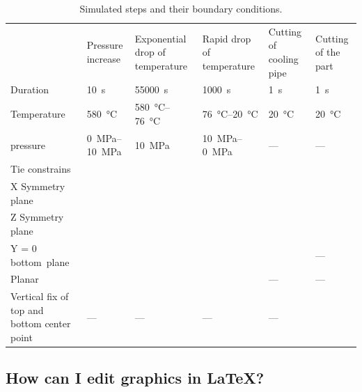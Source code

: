 \begin{table}
	\begin{fullpage} %
			\centering
			\footnotesize
			\begin{tabularx}{\linewidth}{>{\raggedright\arraybackslash}X >{\centering\arraybackslash}X >{\centering\arraybackslash}X >{\centering\arraybackslash}X >{\centering\arraybackslash}X >{\centering\arraybackslash}X}
			  \toprule
			  & Pressure increase & Exponential drop of temperature & Rapid drop of temperature & Cutting of cooling pipe & Cutting of the part \\
			  \cmidrule(r){2-4} \cmidrule(l){5-6}
			  Duration & \qty{10}{\second} & \qty{55000}{\second} & \qty{1000}{\second} & \qty{1}{\second} & \qty{1}{\second} \\
			  \midrule
			  Temperature  & \qty{580}{\celsius} & \qtyrange[range-units=single]{580}{76}{\celsius} & \qtyrange[range-units=single]{76}{20}{\celsius} & \qty{20}{\celsius} & \qty{20}{\celsius} \\
			  \midrule
			  \glsxtrshort{HRP} pressure & \qtyrange[range-units=single]{0}{10}{\mega\pascal} & \qty{10}{\mega\pascal} & \qtyrange[range-units=single]{10}{0}{\mega\pascal} & --- & --- \\
			  \midrule
			  Tie constrains & \checkmark & \checkmark & \checkmark & \checkmark &  \checkmark \\
			  \midrule
			  X Symmetry plane & \checkmark & \checkmark & \checkmark & \checkmark &  \checkmark \\
			  Z Symmetry plane & \checkmark & \checkmark & \checkmark & \checkmark &  \checkmark \\
			  Y = 0 \mbox{bottom plane} & \checkmark & \checkmark & \checkmark & \checkmark & ---  \\
			  \midrule
			  Planar \glsxtrshort{BC} & \checkmark & \checkmark & \checkmark & ---  & --- \\
			  \midrule
			  Vertical fix of top and bottom center point & --- & --- & --- & --- & \checkmark \\
			  \bottomrule
			\end{tabularx}
			\caption{Simulated steps and their boundary conditions.}
			\label{tab:fem-steps}
		\end{fullpage}
\end{table}

\subsection{How can I edit graphics in \LaTeX?}

